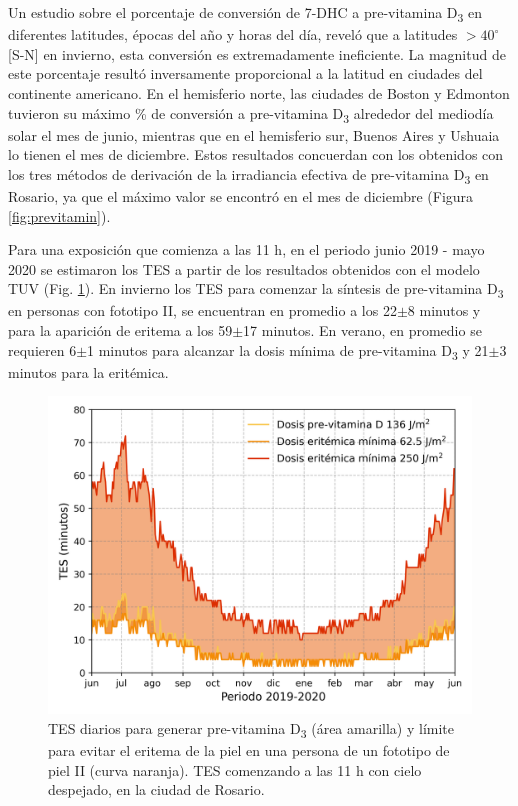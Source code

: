 \documentclass[10pt,twocolumn]{article}
\begin{document}
Un estudio\cite{LuChenHolick_2019} sobre el porcentaje de conversión de 7-DHC a pre-vitamina D\textsubscript{3} en diferentes latitudes, épocas del año y horas del día, reveló que a latitudes $>40^\circ$[S-N] en invierno, esta conversión es extremadamente ineficiente. La magnitud de este porcentaje resultó inversamente proporcional a la latitud en ciudades del continente americano. En el hemisferio norte, las ciudades de Boston y Edmonton tuvieron su máximo \% de conversión a pre-vitamina D\textsubscript{3} alrededor del mediodía solar el mes de junio, mientras que en el hemisferio sur, Buenos Aires y Ushuaia lo tienen el mes de diciembre. Estos resultados concuerdan con los obtenidos con los tres métodos de derivación de la irradiancia efectiva de pre-vitamina D\textsubscript{3} en Rosario, ya que el máximo valor se encontró en el mes de diciembre (Figura \ref{fig:previtamin}).

Para una exposición que comienza a las 11 h, en el periodo junio 2019 - mayo 2020 se estimaron los TES a partir de los resultados obtenidos con el modelo TUV (Fig. \ref{fig:TES}). En invierno los TES para comenzar la síntesis de pre-vitamina D\textsubscript{3} en personas con fototipo II, se encuentran en promedio a los 22$\pm$8 minutos y para la aparición de eritema a los 59$\pm$17 minutos. En verano, en promedio se requieren 6$\pm$1 minutos para alcanzar la dosis mínima de pre-vitamina D\textsubscript{3} y 21$\pm$3 minutos para la eritémica.

\begin{figure}[ht]
  \centering
  \includegraphics[scale=0.47]{dosis_vitamin.png}
  \caption{TES diarios para generar pre-vitamina D\textsubscript{3} (área amarilla) y límite para evitar el eritema de la piel en una persona de un fototipo de piel II (curva naranja). TES comenzando a las 11 h con cielo despejado, en la ciudad de Rosario.}
  \label{fig:TES}
\end{figure}
\end{document}
